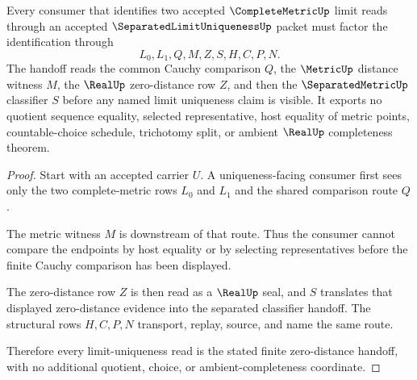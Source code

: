 \begin{theorem}\label{thm:separated-limit-uniqueness-zero-distance-handoff}
Every consumer that identifies two accepted $\CompleteMetricUp$ limit reads through an accepted $\SeparatedLimitUniquenessUp$ packet must factor the identification through
$$
L_{0},L_{1},Q,M,Z,S,H,C,P,N .
$$
The handoff reads the common Cauchy comparison $Q$, the $\MetricUp$ distance witness $M$, the $\RealUp$ zero-distance row $Z$, and then the $\SeparatedMetricUp$ classifier $S$ before any named limit uniqueness claim is visible. It exports no quotient sequence equality, selected representative, host equality of metric points, countable-choice schedule, trichotomy split, or ambient $\RealUp$ completeness theorem.
\end{theorem}
\begin{proof}
Start with an accepted carrier $U$. A uniqueness-facing consumer first sees only the two complete-metric rows $L_{0}$ and $L_{1}$ and the shared comparison route $Q$.

The metric witness $M$ is downstream of that route. Thus the consumer cannot compare the endpoints by host equality or by selecting representatives before the finite Cauchy comparison has been displayed.

The zero-distance row $Z$ is then read as a $\RealUp$ seal, and $S$ translates that displayed zero-distance evidence into the separated classifier handoff. The structural rows $H,C,P,N$ transport, replay, source, and name the same route.

Therefore every limit-uniqueness read is the stated finite zero-distance handoff, with no additional quotient, choice, or ambient-completeness coordinate.
\end{proof}


